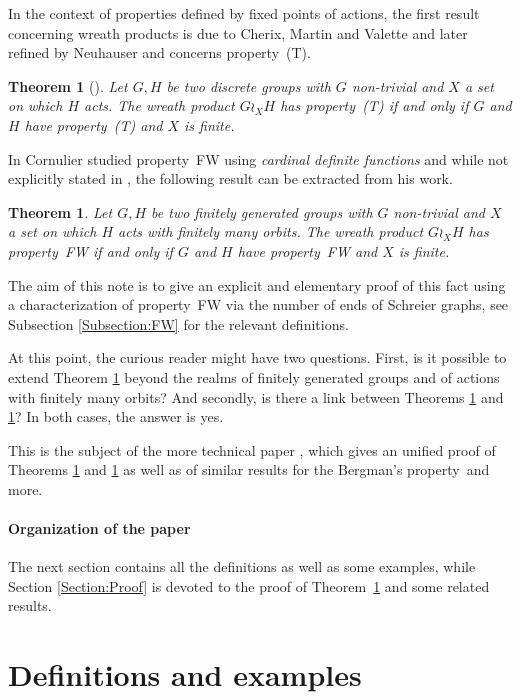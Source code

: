 \documentclass[a4paper]{article}
\newtheorem{thm}[lem]{Theorem}
\theoremstyle{definition}
\theoremstyle{remark}
\begin{document}
In the context of properties defined by fixed points of actions, the first result concerning wreath products is due to Cherix, Martin and Valette and later refined by Neuhauser and concerns property~(T).
%
%
\begin{thm}[\cite{Cherix2004,Neuhauser2005a}] \label{T:Wreath_prop_T}
Let $G,H$ be two discrete groups with $G$ non-trivial and $X$ a set on which $H$ acts. The wreath product $G \wr_X H$ has property~(T) if and only if $G$ and $H$ have property~(T) and $X$ is finite.
\end{thm}
%
%
In \cite{Cornulier2013} Cornulier studied property~FW using \emph{cardinal definite functions} and while not explicitly stated in \cite{Cornulier2013}, the following result can be extracted from his work.
%
%
\begin{thm}\label{Thm:Main}
Let $G,H$ be two finitely generated groups with $G$ non-trivial and $X$ a set on which $H$ acts with finitely many orbits. The wreath product $G \wr_X H$ has property~FW if and only if $G$ and $H$ have property~FW and $X$ is finite.
\end{thm}
%
%
The aim of this note is to give an explicit and elementary proof of this fact using a characterization of property~FW via the number of ends of Schreier graphs, see Subsection \ref{Subsection:FW} for the relevant definitions.


At this point, the curious reader might have two questions. First, is it possible to extend Theorem \ref{Thm:Main} beyond the realms of finitely generated groups and of actions with finitely many orbits? And secondly, is there a link between Theorems \ref{T:Wreath_prop_T} and \ref{Thm:Main}?
In both cases, the answer is yes.

This is the subject of the more technical paper \cite{LS2021}, which gives an unified proof of Theorems \ref{T:Wreath_prop_T} and \ref{Thm:Main} as well as of similar results for the Bergman's property~and more.
%

\paragraph{Organization of the paper}
The next section contains all the definitions as well as some examples, while Section \ref{Section:Proof} is devoted to the proof of Theorem~\ref{Thm:Main} and some related results.
%
\section{Definitions and examples}
\end{document}

